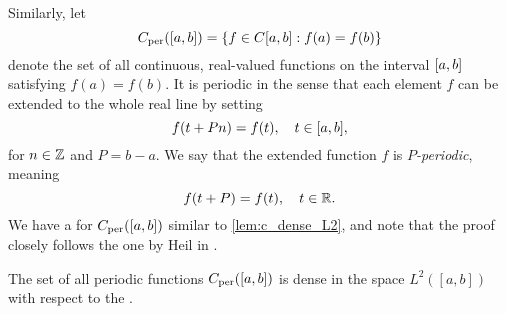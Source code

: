 \documentclass[../thesis.tex]{subfiles}
\begin{document}
Similarly, let 
\begin{equation*}  %
    \Cper([a,b])= \braqMed{f \in C[a,b]: f(a)=f(b)}
\end{equation*}
denote the set of all continuous, real-valued functions on the interval $[a,b]$ satisfying $f(a)=f(b)$. It is periodic in the sense that each element $f$ can be extended to the whole real line by setting 
\begin{equation*}
    f(t+Pn) = f(t), \quad t\in [a,b],
\end{equation*}
for $n\in \mathbb{Z}$ and $P=b-a$. We say that the extended function $f$ is $P$\emph{-periodic}, meaning
\begin{equation*}
    f(t+P) = f(t), \quad t\in \mathbb{R}.
\end{equation*}
We have a  for $C_{\text{per}}([a,b])$ similar to \cref{lem:c_dense_L2}, and note that the proof closely follows the one by Heil in \cite[p.~228]{heilMetricsNormsInner2018}.  %
\begin{lemma}\label{lem:c_per_dense_c_and_dense_L2}
    The set of all periodic functions $C_{\text{per}}([a,b])$ is dense in the space $L^2([a,b])$ with respect to the \Ltwonorm.
\end{lemma}
\end{document}
